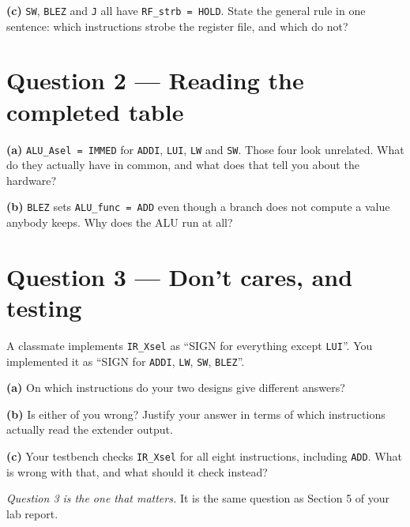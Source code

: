 \documentclass[11pt]{article}
\newcommand{\code}[1]{\texttt{#1}}
\newcommand{\answerbox}[1]{\vspace{2pt}\fbox{\parbox[c][#1][c]{\dimexpr\linewidth-2\fboxsep-2\fboxrule}{\ }}\vspace{4pt}}
\begin{document}
\answerbox{2.2cm}

\textbf{(c)} \code{SW}, \code{BLEZ} and \code{J} all have
\code{RF\_strb = HOLD}. State the general rule in one sentence: which
instructions strobe the register file, and which do not?

\answerbox{1.6cm}

\section*{Question 2 --- Reading the completed table}

\textbf{(a)} \code{ALU\_Asel = IMMED} for \code{ADDI}, \code{LUI}, \code{LW} and
\code{SW}. Those four look unrelated. What do they actually have in common, and
what does that tell you about the hardware?

\answerbox{2.4cm}

\textbf{(b)} \code{BLEZ} sets \code{ALU\_func = ADD} even though a branch does
not compute a value anybody keeps. Why does the ALU run at all?

\answerbox{2.0cm}

\section*{Question 3 --- Don't cares, and testing}

A classmate implements \code{IR\_Xsel} as ``SIGN for everything except
\code{LUI}''. You implemented it as ``SIGN for \code{ADDI}, \code{LW},
\code{SW}, \code{BLEZ}''.

\textbf{(a)} On which instructions do your two designs give different answers?

\answerbox{1.4cm}

\textbf{(b)} Is either of you wrong? Justify your answer in terms of which
instructions actually read the extender output.

\answerbox{2.2cm}

\textbf{(c)} Your testbench checks \code{IR\_Xsel} for all eight instructions,
including \code{ADD}. What is wrong with that, and what should it check instead?

\answerbox{2.2cm}

\vfill
{\small\emph{Question 3 is the one that matters.} It is the same question as
Section 5 of your lab report.}
\end{document}

